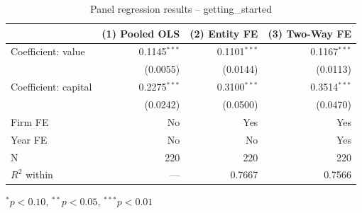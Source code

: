 \begin{table}[htbp]
\centering
\caption{Panel regression results -- getting\_started}
\begin{threeparttable}
\begin{tabular}{lrrr}
\toprule
 & (1) Pooled OLS & (2) Entity FE & (3) Two-Way FE \\
\midrule
Coefficient: value & 0.1145$^{***}$ & 0.1101$^{***}$ & 0.1167$^{***}$ \\
 & (0.0055) & (0.0144) & (0.0113) \\
Coefficient: capital & 0.2275$^{***}$ & 0.3100$^{***}$ & 0.3514$^{***}$ \\
 & (0.0242) & (0.0500) & (0.0470) \\
\midrule
Firm FE & No & Yes & Yes \\
Year FE & No & No & Yes \\
\midrule
N & 220 & 220 & 220 \\
$R^2$ within & --- & 0.7667 & 0.7566 \\
\bottomrule
\end{tabular}
\begin{tablenotes}[flushleft]
  \footnotesize
  \item $^{*}p<0.10$, $^{**}p<0.05$, $^{***}p<0.01$
\end{tablenotes}
\end{threeparttable}
\end{table}